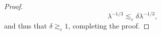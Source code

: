 \documentclass[dvipsnames,letterpaper,12pt]{article}
\DeclareMathOperator{\fordim}{\dim_{\mathbb{F}}}
\DeclareMathOperator{\RR}{\mathbb{R}}
\begin{document}
\begin{proof}
    \[ \lambda^{-1/3} \lesssim_\varepsilon \delta \lambda^{-1/3}, \]
    and thus that $\delta \gtrsim_\varepsilon 1$, completing the proof.
%
\end{proof}

\end{document}
